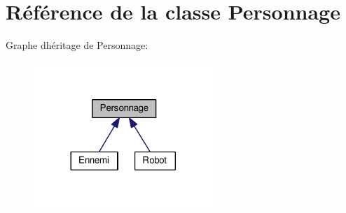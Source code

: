 \hypertarget{classPersonnage}{}\section{Référence de la classe Personnage}
\label{classPersonnage}


Graphe d\textquotesingle{}héritage de Personnage\+:
\nopagebreak
\begin{figure}[H]
\begin{center}
\leavevmode
\includegraphics[width=192pt]{classPersonnage__inherit__graph}
\end{center}
\end{figure}
